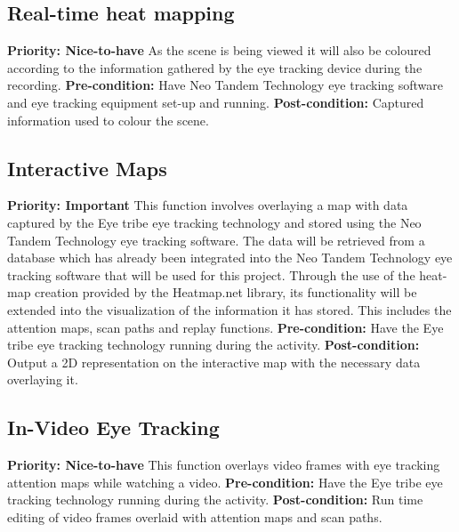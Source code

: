 \subsection{Real-time heat mapping}
    \textbf{Priority: Nice-to-have}\newline
    As the scene is being viewed it will also be coloured according to the information gathered by the eye tracking device during the recording.\newline
    \textbf{Pre-condition: }
    Have Neo Tandem Technology eye tracking software and eye tracking equipment set-up and running.\newline
    \textbf{Post-condition: }
    Captured information used to colour the scene.
    
\subsection{Interactive Maps}
    \textbf{Priority: Important}\newline
    This function involves overlaying a map with data captured by the Eye tribe eye tracking technology and stored using the Neo Tandem Technology eye tracking software. The data will be retrieved from a database which has already been integrated into the Neo Tandem Technology eye tracking software that will be used for this project. Through the use of the heat-map creation provided by the Heatmap.net library, its functionality will be extended into the visualization of the information it has stored. This includes the attention maps, scan paths and replay functions.\newline
    \textbf{Pre-condition: } Have the Eye tribe eye tracking technology running during the activity.\newline   
    \textbf{Post-condition: }Output a 2D representation on the interactive map with the necessary data overlaying it. 
    
\subsection{In-Video Eye Tracking}
    \textbf{Priority: Nice-to-have}\newline
    This function overlays video frames with eye tracking attention maps while watching a video.\newline
    \textbf{Pre-condition: } Have the Eye tribe eye tracking technology running during the activity.\newline
    \textbf{Post-condition: }Run time editing of video frames overlaid with attention maps and scan paths.

